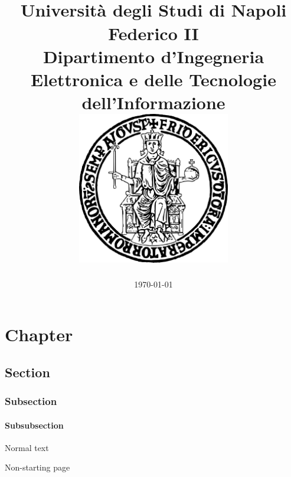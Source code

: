 \documentclass[14pt]{extreport}
\title{
    \color{PRIMARY}\maintitle{} \\
    \color{SECONDARY}\large Università degli Studi di Napoli Federico II \\
    \normalsize Dipartimento d'Ingegneria Elettronica e delle Tecnologie dell'Informazione \\
    \includegraphics[width=0.5\textwidth]{uni_logo.pdf}
    }
\author{\color{PRIMARY}\authors{}}
\date{\color{SECONDARY}\today{}}
\begin{document}
\pagecolor{TERTIARY}\afterpage{\nopagecolor}
\maketitle{}

\tableofcontents{}


\chapter{Chapter}
\section{Section}
\subsection{Subsection}
\subsubsection{Subsubsection}
Normal text

\newpage{}

Non-starting page
\end{document}

